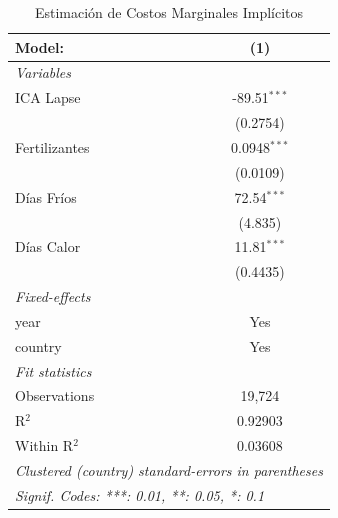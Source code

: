 \begin{table}[htbp]
   \caption{Estimación de Costos Marginales Implícitos}
   \centering
   \begin{tabular}{lc}
      \tabularnewline \midrule \midrule
      Model:        & (1)\\  
      \midrule
      \emph{Variables}\\
      ICA Lapse     & -89.51$^{***}$\\   
                    & (0.2754)\\   
      Fertilizantes & 0.0948$^{***}$\\   
                    & (0.0109)\\   
      Días Fríos    & 72.54$^{***}$\\   
                    & (4.835)\\   
      Días Calor    & 11.81$^{***}$\\   
                    & (0.4435)\\   
      \midrule
      \emph{Fixed-effects}\\
      year          & Yes\\  
      country       & Yes\\  
      \midrule
      \emph{Fit statistics}\\
      Observations  & 19,724\\  
      R$^2$         & 0.92903\\  
      Within R$^2$  & 0.03608\\  
      \midrule \midrule
      \multicolumn{2}{l}{\emph{Clustered (country) standard-errors in parentheses}}\\
      \multicolumn{2}{l}{\emph{Signif. Codes: ***: 0.01, **: 0.05, *: 0.1}}\\
   \end{tabular}
\end{table}



